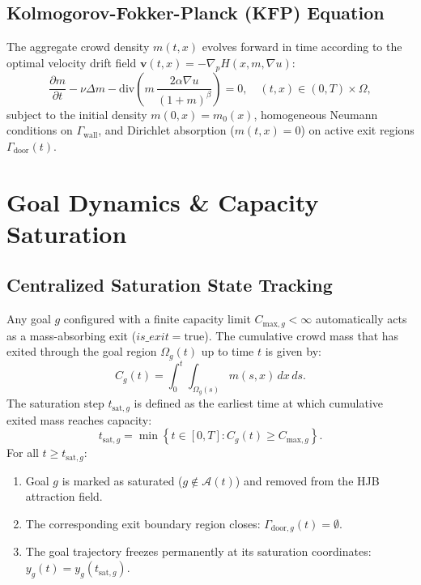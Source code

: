 \documentclass[11pt,a4paper]{article}
\begin{document}
\subsection{Kolmogorov-Fokker-Planck (KFP) Equation}
The aggregate crowd density $m(t, x)$ evolves forward in time according to the optimal velocity drift field $\mathbf{v}(t, x) = -\nabla_p H(x, m, \nabla u)$:
\begin{equation}
\label{eq:kfp}
\frac{\partial m}{\partial t} - \nu \Delta m - \text{div}\left( m \, \frac{2 \alpha \nabla u}{(1 + m)^\beta} \right) = 0, \quad (t, x) \in (0, T) \times \Omega,
\end{equation}
subject to the initial density $m(0, x) = m_0(x)$, homogeneous Neumann conditions on $\Gamma_{\text{wall}}$, and Dirichlet absorption ($m(t, x) = 0$) on active exit regions $\Gamma_{\text{door}}(t)$.

\section{Goal Dynamics \& Capacity Saturation}

\subsection{Centralized Saturation State Tracking}
Any goal $g$ configured with a finite capacity limit $C_{\text{max}, g} < \infty$ automatically acts as a mass-absorbing exit ($is\_exit = \text{true}$). The cumulative crowd mass that has exited through the goal region $\Omega_g(t)$ up to time $t$ is given by:
\begin{equation}
C_g(t) = \int_0^t \int_{\Omega_g(s)} m(s, x) \, dx \, ds.
\end{equation}
The saturation step $t_{\text{sat}, g}$ is defined as the earliest time at which cumulative exited mass reaches capacity:
\begin{equation}
t_{\text{sat}, g} = \min \left\{ t \in [0, T] : C_g(t) \ge C_{\text{max}, g} \right\}.
\end{equation}
For all $t \ge t_{\text{sat}, g}$:
\begin{enumerate}
    \item Goal $g$ is marked as saturated ($g \notin \mathcal{A}(t)$) and removed from the HJB attraction field.
    \item The corresponding exit boundary region closes: $\Gamma_{\text{door}, g}(t) = \emptyset$.
    \item The goal trajectory freezes permanently at its saturation coordinates: $y_g(t) = y_g(t_{\text{sat}, g})$.
\end{enumerate}
\end{document}
